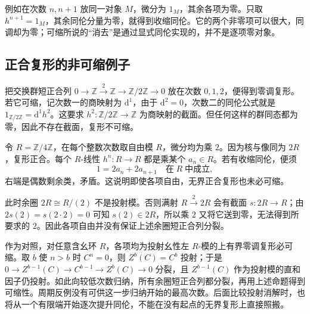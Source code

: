 例如在次数 \(n,n+1\) 放同一对象 \(M\)，微分为 \(1_M\)，其余各项为零。只取 \(h^{n+1}=1_M\)，其余同伦分量为零，就得到收缩同伦。它的两个非零项可以很大，同调却为零；可缩所说的“消去”是通过显式同伦实现的，并不是逐项零对象。

\subsection{正合复形的非可缩例子}
\label{b4:subsec:0601:03}

\begin{example}\label{b4:exm:acyclic-not-contractible}
	把交换群短正合列 \(0\to\mathbb Z\xrightarrow{2}\mathbb Z\to\mathbb Z/2\mathbb Z\to0\) 放在次数 \(0,1,2\)，便得到零调复形。若它可缩，记次数一的商映射为 \(\mathrm{d}^1\)，由于 \(\mathrm{d}^2=0\)，次数二的同伦公式就是 \(1_{\mathbb Z/2\mathbb Z}=\mathrm{d}^1h^2\)。这要求 \(h^2:\mathbb Z/2\mathbb Z\to\mathbb Z\) 为商映射的截面。但任何这样的群同态都为零，因此不存在截面，复形不可缩。
\end{example}

\begin{example}\label{b4:exm:acyclic-free-periodic}
	令 \(R=\mathbb Z/4\mathbb Z\)，在每个整数次数取自由模 \(R\)，微分均为乘 \(2\)。因为核与像同为 \(2R\)，复形正合。每个 \(R\)-线性 \(h^n:R\to R\) 都是乘某个 \(a_n\in R\)。若有收缩同伦，便须
	\[
		1=2a_n+2a_{n+1}\quad\text{在}\;R\;\text{中成立},
	\]
	右端是偶数剩余类，矛盾。这说明即使各项自由，无界正合复形也未必可缩。

	\ProseParagraphBreak
	此时余圈 \(2R\cong R/(2)\) 不是投射模。否则满射 \(R\xrightarrow{2}2R\) 会有截面 \(s:2R\to R\)；由 \(2s(2)=s(2\cdot2)=0\) 可知 \(s(2)\in2R\)，所以乘 \(2\) 又将它送到零，无法得到所要求的 \(2\)。因此各项自由并没有保证上述余圈短正合列分裂。
\end{example}

作为对照，对任意含幺环 \(R\)，各项均为投射幺性左 \(R\)-模的上有界零调复形必可缩。取 \(b\) 使 \(n>b\) 时 \(C^n=0\)，则 \(Z^b(C)=C^b\) 投射；于是 \(0\to Z^{b-1}(C)\to C^{b-1}\to Z^b(C)\to0\) 分裂，且 \(Z^{b-1}(C)\) 作为投射模的直和因子仍投射。如此向较低次数归纳，所有余圈短正合列都分裂，再用上述命题得到可缩性。周期反例没有可供这一步归纳开始的最高次数。后面比较投射消解时，也将从一个有限端开始逐次提升同伦，不能在没有起点的无界复形上直接照搬。
